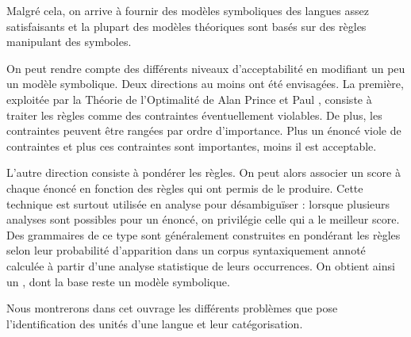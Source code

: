 Malgré cela, on arrive à fournir des modèles symboliques des langues assez satisfaisants et la plupart des modèles théoriques sont basés sur des règles manipulant des symboles.

On peut rendre compte des différents niveaux d’acceptabilité en modifiant un peu un modèle symbolique. Deux directions au moins ont été envisagées. La première, exploitée par la Théorie de l’Optimalité de Alan Prince et Paul \citet{Smolensky1993}, consiste à traiter les règles comme des contraintes éventuellement violables. De plus, les contraintes peuvent être rangées par ordre d’importance. Plus un énoncé viole de contraintes et plus ces contraintes sont importantes, moins il est acceptable.

L’autre direction consiste à pondérer les règles. On peut alors associer un score à chaque énoncé en fonction des règles qui ont permis de le produire. Cette technique est surtout utilisée en analyse pour désambiguïser : lorsque plusieurs analyses sont possibles pour un énoncé, on privilégie celle qui a le meilleur score. Des grammaires de ce type sont généralement construites en pondérant les règles selon leur probabilité d’apparition dans un corpus syntaxiquement annoté calculée à partir d’une analyse statistique de leurs occurrences. On obtient ainsi un , dont la base reste un modèle symbolique.

Nous montrerons dans cet ouvrage les différents problèmes que pose l’identification des unités d’une langue et leur catégorisation.

